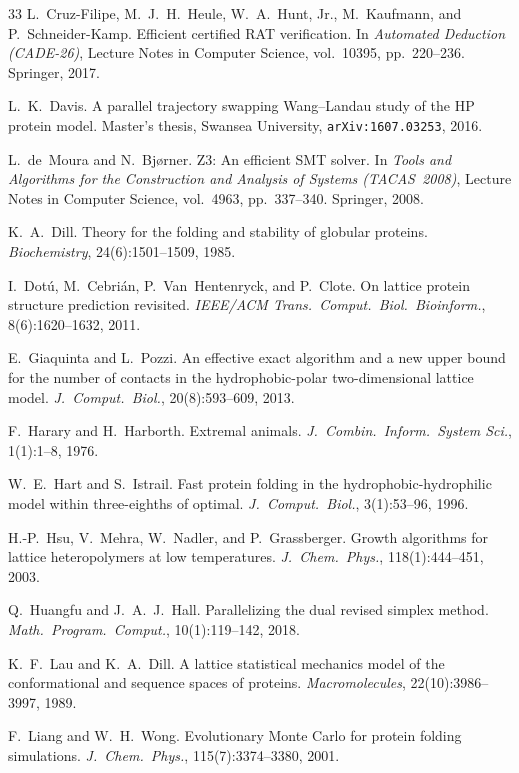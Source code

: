 \documentclass[11pt]{article}
\begin{document}
\begin{thebibliography}{33}
L.~Cruz-Filipe, M.~J.~H.~Heule, W.~A.~Hunt, Jr., M.~Kaufmann, and P.~Schneider-Kamp.
Efficient certified RAT verification.
In \emph{Automated Deduction (CADE-26)}, Lecture Notes in Computer Science, vol.~10395, pp.~220--236. Springer, 2017.

L.~K.~Davis.
A parallel trajectory swapping Wang--Landau study of the HP protein model.
Master's thesis, Swansea University, \texttt{arXiv:1607.03253}, 2016.

L.~de~Moura and N.~Bj{\o}rner.
Z3: An efficient SMT solver.
In \emph{Tools and Algorithms for the Construction and Analysis of Systems (TACAS~2008)}, Lecture Notes in Computer Science, vol.~4963, pp.~337--340. Springer, 2008.

K.~A.~Dill.
Theory for the folding and stability of globular proteins.
\emph{Biochemistry}, 24(6):1501--1509, 1985.

I.~Dot\'u, M.~Cebri\'an, P.~Van~Hentenryck, and P.~Clote.
On lattice protein structure prediction revisited.
\emph{IEEE/ACM Trans.\ Comput.\ Biol.\ Bioinform.}, 8(6):1620--1632, 2011.

E.~Giaquinta and L.~Pozzi.
An effective exact algorithm and a new upper bound for the number of contacts in the hydrophobic-polar two-dimensional lattice model.
\emph{J.\ Comput.\ Biol.}, 20(8):593--609, 2013.

F.~Harary and H.~Harborth.
Extremal animals.
\emph{J.\ Combin.\ Inform.\ System Sci.}, 1(1):1--8, 1976.

W.~E.~Hart and S.~Istrail.
Fast protein folding in the hydrophobic-hydrophilic model within three-eighths of optimal.
\emph{J.\ Comput.\ Biol.}, 3(1):53--96, 1996.

H.-P.~Hsu, V.~Mehra, W.~Nadler, and P.~Grassberger.
Growth algorithms for lattice heteropolymers at low temperatures.
\emph{J.\ Chem.\ Phys.}, 118(1):444--451, 2003.

Q.~Huangfu and J.~A.~J.~Hall.
Parallelizing the dual revised simplex method.
\emph{Math.\ Program.\ Comput.}, 10(1):119--142, 2018.

K.~F.~Lau and K.~A.~Dill.
A lattice statistical mechanics model of the conformational and sequence spaces of proteins.
\emph{Macromolecules}, 22(10):3986--3997, 1989.

F.~Liang and W.~H.~Wong.
Evolutionary Monte Carlo for protein folding simulations.
\emph{J.\ Chem.\ Phys.}, 115(7):3374--3380, 2001.


\end{thebibliography}
\end{document}
